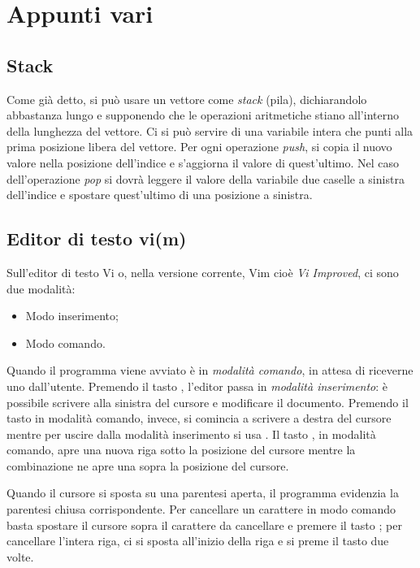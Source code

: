 \chapter{Appunti vari}
	\section{Stack}
	\label{sec:vari:stack}
Come già detto, si può usare un vettore come \emph{stack} (pila), dichiarandolo abbastanza lungo e supponendo che le operazioni aritmetiche stiano all'interno della lunghezza del vettore.
Ci si può servire di una variabile intera che punti alla prima posizione libera del vettore.
Per ogni operazione \emph{push}, si copia il nuovo valore nella posizione dell'indice e s'aggiorna il valore di quest'ultimo.
Nel caso dell'operazione \emph{pop} si dovrà leggere il valore della variabile due caselle a sinistra dell'indice e spostare quest'ultimo di una posizione a sinistra.

	\section[Editor di testo \textsf{vi(m)}]{Editor di testo vi(m)}

Sull'editor di testo \textsf{Vi} o, nella versione corrente, \textsf{Vim} cioè \emph{Vi Improved}, ci sono due modalità:
\begin{itemize}
	\item Modo inserimento;
	\item Modo comando.
\end{itemize}
Quando il programma viene avviato è in \emph{modalità comando}, in attesa di riceverne uno dall'utente.
Premendo il tasto , l'editor passa in \emph{modalità inserimento}: è possibile scrivere alla sinistra del cursore e modificare il documento.
Premendo il tasto  in modalità comando, invece, si comincia a scrivere a destra del cursore mentre per uscire dalla modalità inserimento si usa .
Il tasto , in modalità comando, apre una nuova riga sotto la posizione del cursore mentre la combinazione  ne apre una sopra la posizione del cursore.


Quando il cursore si sposta su una parentesi aperta, il programma evidenzia la parentesi chiusa corrispondente.
Per cancellare un carattere in modo comando basta spostare il cursore sopra il carattere da cancellare e premere il tasto ; per cancellare l'intera riga, ci si sposta all'inizio della riga e si preme il tasto  due volte.


